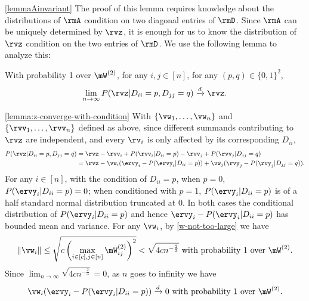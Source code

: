 \begin{proofof}{\cref{lemmaAinvariant}}
The proof of this lemma requires knowledge about the distributions of $\rmA$ condition on two diagonal entries of $\rmD$. Since $\rmA$ can be uniquely determined by $\rvz$, it is enough for us to know the distribution of $\rvz$ condition on the two entries of $\rmD$. We use the following lemma to analyze this:

\begin{lemma}
\label{lemma:z-converge-with-condition}
With probability 1 over $\mW^{(2)}$,  for any $i,j\in[n]$, for any $(p,q)\in\{0,1\}^2$, 
\begin{equation}
\lim_{n\to\infty}P(\rvz\vert D_{ii}=p,D_{jj}=q) \xrightarrow{d}\rvz.
\end{equation}

\end{lemma}
\begin{proofof}{\cref{lemma:z-converge-with-condition}}
With $\{\vw_1,\ldots, \vw_n\}$ and $\{\rvv_1,\ldots, \rvv_n\}$ defined as above, since different summands contributing to $\rvz$ are independent, and every $\rv_i$ is only affected by its corresponding $D_{ii}$,
\begin{equation}
\begin{split}
    P(\rvz\vert D_{ii}=p,D_{jj}=q) &= \rvz - \rvv_i + P(\rvv_i\vert D_{ii}=p) - \rvv_j + P(\rvv_j\vert D_{jj}=q)\\
    &= \rvz - \vw_i(\ervy_i - P(\ervy_i\vert D_{ii}=p)) + \vw_j(\rvy_j - P(\rvy_j\vert D_{jj}=q)).
\end{split}
\end{equation}
For any $i\in[n]$, with the condition of $D_{ii} = p$, when $p=0$, $P(\ervy_i\vert D_{ii}=p)=0$; when conditioned with $p=1$, $P(\ervy_i\vert D_{ii}=p)$ is of a half standard normal distribution truncated at 0. In both cases the conditional distribution of $P(\ervy_i\vert D_{ii}=p)$ and hence $\ervy_i-P(\ervy_i\vert D_{ii}=p)$ has bounded mean and variance. For any $\vw_i$, by \cref{w-not-too-large} we have
\begin{equation}
    \left\Vert\vw_i\right\Vert \leq \sqrt{c\left(\max_{i\in[c],j\in[n]}\mW^{(2)}_{ij}\right)^2} < \sqrt{4cn^{-\frac{2}{3}}} \text{ with probability 1 over }\mW^{(2)}.
\end{equation}
Since $\lim_{n\to\infty}\sqrt{4cn^{-\frac{2}{3}}}=0$, as $n$ goes to infinity we have \begin{equation}
    \vw_i(\ervy_i - P(\ervy_i\vert D_{ii}=p))\xrightarrow{d} 0 \text{ with probability 1 over } \mW^{(2)}.

\end{equation}
\end{proofof}
\end{proofof}
